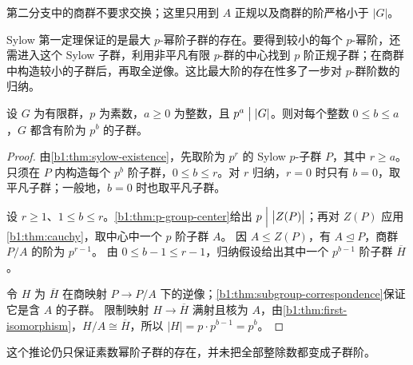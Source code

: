 第二分支中的商群不要求交换；这里只用到 \(A\) 正规以及商群的阶严格小于 \(|G|\)。

\ProseParagraphBreak
Sylow 第一定理保证的是最大 \(p\)-幂阶子群的存在。要得到较小的每个 \(p\)-幂阶，还需进入这个 Sylow 子群，利用非平凡有限 \(p\)-群的中心找到 \(p\) 阶正规子群；在商群中构造较小的子群后，再取全逆像。这比最大阶的存在性多了一步对 \(p\)-群阶数的归纳。

\begin{corollary}\label{b1:cor:all-p-power-subgroups}
	设 \(G\) 为有限群，\(p\) 为素数，\(a\geq0\) 为整数，且 \(p^a\bigm\vert|G|\)。则对每个整数 \(0\leq b\leq a\)，\(G\) 都含有阶为 \(p^b\) 的子群。
\end{corollary}

\begin{proof}
	由\cref{b1:thm:sylow-existence}，先取阶为 \(p^r\) 的 Sylow \(p\)-子群 \(P\)，其中 \(r\geq a\)。 只须在 \(P\) 内构造每个 \(p^b\) 阶子群，\(0\leq b\leq r\)。对 \(r\) 归纳，\(r=0\) 时只有 \(b=0\)，取平凡子群；一般地，\(b=0\) 时也取平凡子群。

	设 \(r\geq1\)、\(1\leq b\leq r\)。\cref{b1:thm:p-group-center}给出 \(p\Bigm\vert\bigl|Z(P)\bigr|\)；再对 \(Z(P)\) 应用\cref{b1:thm:cauchy}，取中心中一个 \(p\) 阶子群 \(A\)。 因 \(A\leq Z(P)\)，有 \(A\trianglelefteq P\)，商群 \(P/A\) 的阶为 \(p^{r-1}\)。 由 \(0\leq b-1\leq r-1\)，归纳假设给出其中一个 \(p^{b-1}\) 阶子群 \(\overline H\)。

	令 \(H\) 为 \(\overline H\) 在商映射 \(P\rightarrow P/A\) 下的逆像；\cref{b1:thm:subgroup-correspondence}保证它是含 \(A\) 的子群。 限制映射 \(H\rightarrow\overline H\) 满射且核为 \(A\)，由\cref{b1:thm:first-isomorphism}，\(H/A\cong\overline H\)，所以 \(|H|=p\cdot p^{b-1}=p^b\)。
\end{proof}

这个推论仍只保证素数幂阶子群的存在，并未把全部整除数都变成子群阶。
